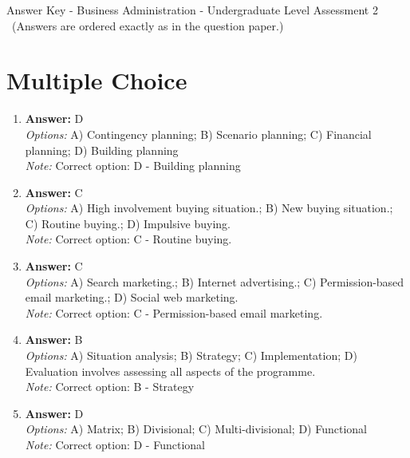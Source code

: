 \documentclass[12pt]{article}
\begin{document}
\begin{center}
Answer Key - Business Administration - Undergraduate Level Assessment 2 \
\small (Answers are ordered exactly as in the question paper.)
\end{center}

\section*{Multiple Choice}
\begin{enumerate}[label=\arabic*.]
\item \textbf{Answer:} D
\\ \textit{Options:} A) Contingency planning; B) Scenario planning; C) Financial planning; D) Building planning
\\ \textit{Note:} Correct option: D - Building planning
\item \textbf{Answer:} C
\\ \textit{Options:} A) High involvement buying situation.; B) New buying situation.; C) Routine buying.; D) Impulsive buying.
\\ \textit{Note:} Correct option: C - Routine buying.
\item \textbf{Answer:} C
\\ \textit{Options:} A) Search marketing.; B) Internet advertising.; C) Permission-based email marketing.; D) Social web marketing.
\\ \textit{Note:} Correct option: C - Permission-based email marketing.
\item \textbf{Answer:} B
\\ \textit{Options:} A) Situation analysis; B) Strategy; C) Implementation; D) Evaluation involves assessing all aspects of the programme.
\\ \textit{Note:} Correct option: B - Strategy
\item \textbf{Answer:} D
\\ \textit{Options:} A) Matrix; B) Divisional; C) Multi-divisional; D) Functional
\\ \textit{Note:} Correct option: D - Functional
\end{enumerate}
\end{document}
